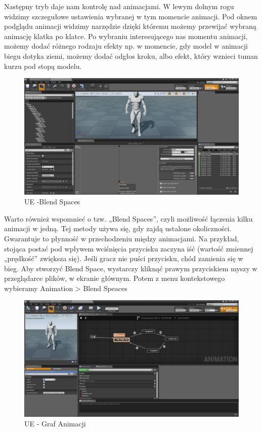 \documentclass[brudnopis]{xmgr}
\begin{document}
Następny tryb daje nam kontrolę nad animacjami. W lewym dolnym rogu widzimy szczegułowe ustawienia wybranej w tym momencie animacji.
Pod oknem podglądu animacji widzimy narzędzie dzięki któremu możemy przewijać wybraną animację klatka po klatce. Po wybraniu interesującego nas momentu animacji, możemy dodać różnego rodzaju efekty np. w momencie, gdy model w animacji biegu dotyka ziemi, możemy dodać odgłos kroku, albo efekt, który wznieci tuman kurzu pod stopą modelu.

\begin{figure}[!htb]
    \begin{center}
    \includegraphics[scale=0.25]{Screeny/Blend_Space}
    \end{center}
    \caption{UE -Blend Spaces}
\end{figure}

Warto również wspomnieć o tzw. „Blend Spaces”, czyli możliwość łączenia kilku animacji w jedną. Tej metody używa się, gdy zajdą ustalone okoliczności. Gwarantuje to płynność w przechodzeniu między animacjami. Na przykład, stojąca postać pod wpływem wciśnięcia przycisku zaczyna iść (wartość zmiennej „prędkość” zwiększa się). Jeśli gracz nie puści przycisku, chód zamienia się w bieg.
Aby stworzyć Blend Space, wystarczy kliknąć prawym przyciskiem myszy w przeglądarce plików, w ekranie głównym. Potem z menu kontekstowego wybieramy Animation > Blend Speaces


\begin{figure}[!htb]
    \begin{center}
    \includegraphics[scale=0.25]{Screeny/AnimGraph_Event}
    \end{center}
    \caption{UE - Graf Animacji}
\end{figure}
\end{document}
